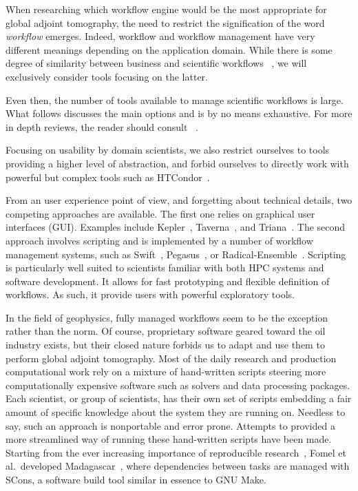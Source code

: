 When researching which workflow engine would be the most appropriate for
global adjoint tomography, the need to restrict the signification of the word
\emph{workflow} emerges. Indeed, workflow and workflow management have very
different meanings depending on the application domain. While there is some degree of
similarity between business and scientific workflows ~\cite{Ludascher2009}, we
will exclusively consider tools focusing on the latter.

Even then, the number of tools available to manage scientific workflows is large. What
follows discusses the main options and is by no means exhaustive. For more
in depth reviews, the reader should consult
~\cite{Yu2005, Hemert2008, Curcin2008}.

Focusing on usability by domain scientists, we also restrict ourselves to tools
providing a higher level of abstraction, and forbid ourselves to directly work
with powerful but complex tools such as HTCondor~\cite{condor-practice}.

From an user experience point of view, and forgetting about technical details,
two competing approaches are available. The first one relies on graphical user
interfaces (GUI). Examples include Kepler~\cite{Altintas2004},
Taverna~\cite{Wolstencroft2013}, and Triana~\cite{Taylor2007}.
The second approach involves scripting and is implemented by
a number of workflow management systems, such as Swift~\cite{Wilde2009},
Pegasus~\cite{Deelman201517}, or Radical-Ensemble~\cite{Turilli2016}.
Scripting is particularly well suited to scientists familiar with both HPC systems
and software development. It allows for fast prototyping and flexible definition
of workflows. As such, it provide users with powerful exploratory tools.

In the field of geophysics, fully managed workflows seem to be the exception
rather than the norm. Of course, proprietary software geared toward the oil
industry exists, but their closed nature forbids us to adapt and use them to
perform global adjoint tomography.
Most of the daily research and production computational work rely on a mixture
of hand-written scripts steering more computationally expensive software such as
solvers and data processing packages. Each scientist, or group of scientists, has
their own set of scripts embedding a fair amount of specific knowledge about the
system they are running on. Needless to say, such an approach is nonportable and error prone.
Attempts to provided a more streamlined way of running these hand-written 
scripts have been made. Starting from the ever increasing importance of
reproducible research~\cite{Fomel2007}, Fomel et al.\ developed
Madagascar~\cite{Fomel2013}, where dependencies between tasks are managed with
SCons, a software build tool similar in essence to GNU Make.

